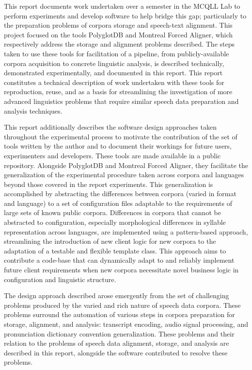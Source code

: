 \documentclass[11pt]{article}
\begin{document}
This report documents work undertaken over a semester in the MCQLL Lab to perform experiments and develop software to help bridge this gap; particularly to the preparation problems of corpora storage and speech-text alignment. This project focused on the tools PolyglotDB\cite{mcauliffe_polyglot_2017} and Montreal Forced Aligner\cite{mcauliffe_montreal_nodate}, which respectively address the storage and alignment problems described. The steps taken to use these tools for facilitation of a pipeline, from publicly-available corpora acquisition to concrete linguistic analysis, is described technically, demonstrated experimentally, and documented in this report. This report constitutes a technical description of work undertaken with these tools for reproduction, reuse, and as a basis for streamlining the investigation of more advanced linguistics problems that require similar speech data preparation and analysis techniques.

This report additionally describes the software design approaches taken throughout the experimental process to motivate the contribution of the set of tools written by the author and to document their workings for future users, experimenters and developers. These tools are made available in a public repository. Alongside PolyglotDB and Montreal Forced Aligner, they facilitate the generalization of the experimental procedure taken across corpora and languages beyond those covered in the report experiments. This generalization is accomplished by abstracting the differences between corpora (varied in format and language) to a set of configuration files adaptable to the requirements of large sets of known public corpora. Differences in corpora that cannot be abstracted to configuration, especially morphological differences in syllable representation across languages, are implemented using a pattern-based approach, streamlining the introduction of new client logic for new corpora to the adaptation of a testable and flexible template class. This approach aims to contribute a code-base that can dynamically adapt to and reliably implement future client requirements when new corpora necessitate novel business logic in configuration and linguistic structure.

The design approach described arose emergently from the set of challenging problems produced by the varied and rich nature of speech data corpora. These problems surround the automation of various steps in corpora preparation for storage, alignment, and analysis: transcript encoding, audio signal processing, and pronunciation dictionary convention generalization. These problems and their relation to the problems of speech data alignment, storage, and analysis are described in this report, alongside the software contributed to resolve these problems.
\end{document}
